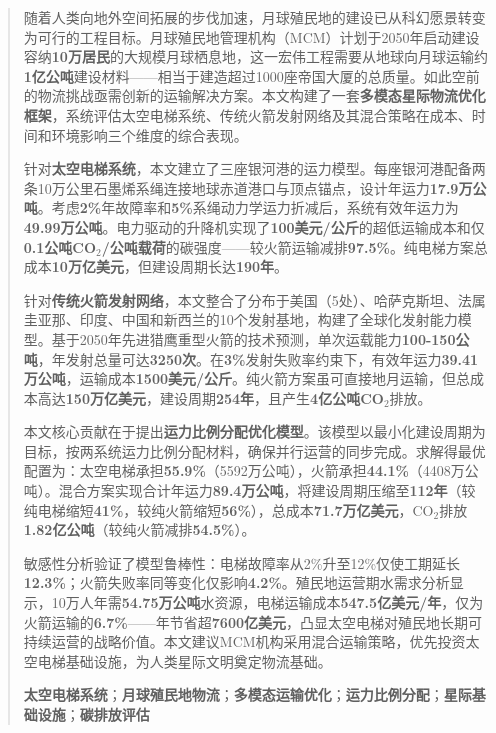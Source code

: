 \renewcommand{\abstractname}{摘要}
\begin{abstract}

随着人类向地外空间拓展的步伐加速，月球殖民地的建设已从科幻愿景转变为可行的工程目标。月球殖民地管理机构（MCM）计划于2050年启动建设容纳\textbf{10万居民}的大规模月球栖息地，这一宏伟工程需要从地球向月球运输约\textbf{1亿公吨}建设材料——相当于建造超过1000座帝国大厦的总质量。如此空前的物流挑战亟需创新的运输解决方案。本文构建了一套\textbf{多模态星际物流优化框架}，系统评估太空电梯系统、传统火箭发射网络及其混合策略在成本、时间和环境影响三个维度的综合表现。

针对\textbf{太空电梯系统}，本文建立了三座银河港的运力模型。每座银河港配备两条10万公里石墨烯系绳连接地球赤道港口与顶点锚点，设计年运力\textbf{17.9万公吨}。考虑\textbf{2\%}年故障率和\textbf{5\%}系绳动力学运力折减后，系统有效年运力为\textbf{49.99万公吨}。电力驱动的升降机实现了\textbf{100美元/公斤}的超低运输成本和仅\textbf{0.1公吨CO$_2$/公吨载荷}的碳强度——较火箭运输减排\textbf{97.5\%}。纯电梯方案总成本\textbf{10万亿美元}，但建设周期长达\textbf{190年}。

针对\textbf{传统火箭发射网络}，本文整合了分布于美国（5处）、哈萨克斯坦、法属圭亚那、印度、中国和新西兰的10个发射基地，构建了全球化发射能力模型。基于2050年先进猎鹰重型火箭的技术预测，单次运载能力\textbf{100-150公吨}，年发射总量可达\textbf{3250次}。在\textbf{3\%}发射失败率约束下，有效年运力\textbf{39.41万公吨}，运输成本\textbf{1500美元/公斤}。纯火箭方案虽可直接地月运输，但总成本高达\textbf{150万亿美元}，建设周期\textbf{254年}，且产生\textbf{4亿公吨CO$_2$}排放。

本文核心贡献在于提出\textbf{运力比例分配优化模型}。该模型以最小化建设周期为目标，按两系统运力比例分配材料，确保并行运营的同步完成。求解得最优配置为：太空电梯承担\textbf{55.9\%}（5592万公吨），火箭承担\textbf{44.1\%}（4408万公吨）。混合方案实现合计年运力\textbf{89.4万公吨}，将建设周期压缩至\textbf{112年}（较纯电梯缩短\textbf{41\%}，较纯火箭缩短\textbf{56\%}），总成本\textbf{71.7万亿美元}，CO$_2$排放\textbf{1.82亿公吨}（较纯火箭减排\textbf{54.5\%}）。

敏感性分析验证了模型鲁棒性：电梯故障率从2\%升至12\%仅使工期延长\textbf{12.3\%}；火箭失败率同等变化仅影响\textbf{4.2\%}。殖民地运营期水需求分析显示，10万人年需\textbf{54.75万公吨}水资源，电梯运输成本\textbf{547.5亿美元/年}，仅为火箭运输的\textbf{6.7\%}——年节省超\textbf{7600亿美元}，凸显太空电梯对殖民地长期可持续运营的战略价值。本文建议MCM机构采用混合运输策略，优先投资太空电梯基础设施，为人类星际文明奠定物流基础。

\begin{keywords}
\textbf{太空电梯系统}；\textbf{月球殖民地物流}；\textbf{多模态运输优化}；\textbf{运力比例分配}；\textbf{星际基础设施}；\textbf{碳排放评估}
\end{keywords}

\end{abstract}
